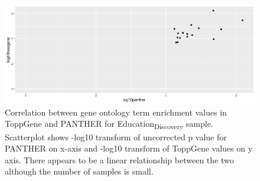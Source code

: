 \begin{figure}
    \centering
    \includegraphics[width=\textwidth]{images/chapter2/strontium/Rplot_compare_toppgene_panther.png}
    \caption{Correlation between gene ontology term enrichment values in ToppGene and PANTHER for Education\textsubscript{Discovery} sample. Scatterplot shows -log10 transform of uncorrected p value for PANTHER on x-axis and -log10 transform of ToppGene values on y axis. There appears to be a linear relationship between the two although the number of samples is small.}
    \label{fig:correlation of gene ontology terms between toppgene and panther}
\end{figure}



